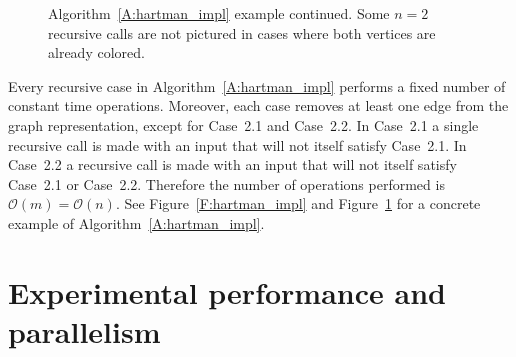 \documentclass[12pt,letterpaper]{article}
\theoremstyle{plain}
\theoremstyle{definition}
\theoremstyle{break}
\begin{document}
\begin{figure}
\begin{center}

\caption{Algorithm~\ref{A:hartman_impl} example continued. Some $n=2$ recursive
calls are not pictured in cases where both vertices are already colored.}
\label{F:hartman_impl_cont}
\end{center}
\end{figure}

Every recursive case in Algorithm~\ref{A:hartman_impl} performs a fixed number
of constant time operations. Moreover,
each case removes at least one edge from the graph representation,
except for Case~2.1 and Case~2.2. In Case~2.1 a single recursive call is made
with an input that will not itself satisfy Case~2.1. In Case~2.2 a recursive
call is made with an input that will not itself satisfy Case~2.1 or Case~2.2.
Therefore the number of operations performed
is $\mathcal{O}(m)=\mathcal{O}(n)$. See Figure~\ref{F:hartman_impl} and
Figure~\ref{F:hartman_impl_cont} for a concrete example of
Algorithm~\ref{A:hartman_impl}.

\section{Experimental performance and parallelism}
\end{document}
